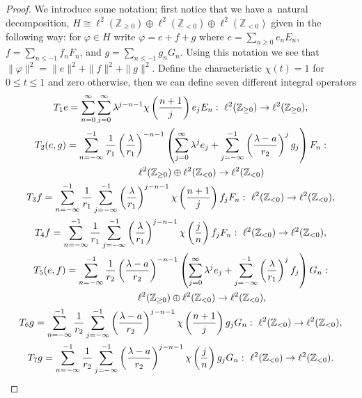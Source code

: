 \documentclass[11pt]{article}
\numberwithin{equation}{section}
\begin{document}
\begin{proof}
We introduce some notation; f\/irst notice that we have a~natural decomposition, $H \!\cong\! \ell^2({\mathbb Z}_{\ge0})
\oplus \ell^2({\mathbb Z}_{<0}) \oplus \ell^2({\mathbb Z}_{<0})$ given in the following way: for $\varphi\in H$ write
$\varphi=e+f+g$ where $e=\sum\limits_{n\ge0}e_nE_n$, $f= \sum\limits_{n\le-1}f_nF_n$, and $g=\sum\limits_{n\le-1}g_nG_n$.
Using this notation we see that $\|\varphi\|^2=\|e\|^2+\|f\|^2+\|g\|^2$.
Def\/ine the characteristic $\chi(t)=1$ for $0\le t\le1$ and zero otherwise, then we can def\/ine seven dif\/ferent integral operators
\begin{gather}
T_1e=\sum\limits_{n=0}^\infty\sum\limits_{j=0}^\infty \lambda^{j-n-1}\chi\left(\frac{n+1}{j}\right)e_jE_n: \
\ell^2({\mathbb Z}_{\ge0})\to\ell^2({\mathbb Z}_{\ge0}),
\nonumber
\\
T_2(e,g)=\sum\limits_{n=-\infty}^{-1}\frac{1}{r_1}\left(\frac{\lambda}{r_1}\right)^{-n-1}\left(\sum\limits_{j=0}^\infty\lambda^je_j
+ \sum\limits_{j=-\infty}^{-1}\left(\frac{\lambda-a}{r_2}\right)^jg_j\right)F_n :
\nonumber
\\
\hphantom{T_2(e,g)=}{} \ell^2({\mathbb Z}_{\ge0})\oplus\ell^2({\mathbb Z}_{<0})\to\ell^2({\mathbb Z}_{<0})
\nonumber
\\
T_3f =
\sum\limits_{n=-\infty}^{-1}\frac{1}{r_1}\sum\limits_{j=-\infty}^{-1}\left(\frac{\lambda}{r_1}\right)^{j-n-1}\chi\left(\frac{n+1}{j}\right)f_jF_n: \
\ell^2({\mathbb Z}_{<0})\to\ell^2({\mathbb Z}_{<0}),
\nonumber
\\
\label{int_ops_resolvent_z}
T_4f =
\sum\limits_{n=-\infty}^{-1}\frac{1}{r_1}\sum\limits_{j=-\infty}^{-1}\left(\frac{\lambda}{r_1}\right)^{j-n-1}\chi\left(\frac{j}{n}\right)f_jF_n: \
\ell^2({\mathbb Z}_{<0})\to\ell^2({\mathbb Z}_{<0}),
\\
T_5(e,f) =\sum\limits_{n=-\infty}^{-1}\frac{1}{r_2}\left(\frac{\lambda-a}{r_2}\right)^{-n-1}
\left(\sum\limits_{j=0}^\infty\lambda^je_j+\sum\limits_{j=-\infty}^{-1}\left(\frac{\lambda}{r_1}\right)^jf_j\right)G_n:
\nonumber
\\
\hphantom{T_5(e,f) =}{} \ell^2({\mathbb Z}_{\ge0})\oplus\ell^2({\mathbb Z}_{<0})\to\ell^2({\mathbb Z}_{<0}),
\nonumber
\\
T_6g=\sum\limits_{n=-\infty}^{-1}\frac{1}{r_2}\sum\limits_{j=-\infty}^{-1}\left(\frac{\lambda-a}{r_2}\right)^{j-n-1}
\chi\left(\frac{n+1}{j}\right)g_j G_n: \ \ell^2({\mathbb Z}_{<0})\to\ell^2({\mathbb Z}_{<0}),
\nonumber
\\
T_7g=\sum\limits_{n=-\infty}^{-1}\frac{1}{r_2}\sum\limits_{j=-\infty}^{-1}\left(\frac{\lambda-a}{r_2}\right)^{j-n-1}
\chi\left(\frac{j}{n}\right)g_j G_n: \  \ell^2({\mathbb Z}_{<0})\to\ell^2({\mathbb Z}_{<0}).
\nonumber
\end{gather}


\end{proof}
\end{document}

